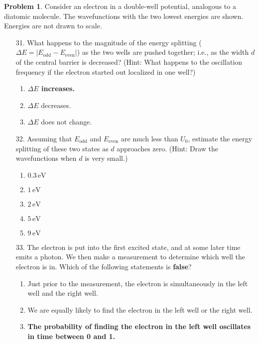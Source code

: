 \documentclass[12pt]{article}
\theoremstyle{definition} %
\newtheorem{problem}{Problem}
\theoremstyle{plain} %
\begin{document}
\begin{problem}
    
Consider an electron in a double-well potential, analogous to a diatomic molecule. The wavefunctions with the two lowest energies are shown. Energies are not drawn to scale.

\begin{enumerate}
    \item[31.] What happens to the magnitude of the energy splitting (\(\Delta E = |E_{\text{odd}} - E_{\text{even}}|\)) as the two wells are pushed together; i.e., as the width \(d\) of the central barrier is decreased? (Hint: What happens to the oscillation frequency if the electron started out localized in one well?)
    \begin{enumerate}
        \item \textbf{\(\Delta E\) increases.}
        \item \(\Delta E\) decreases.
        \item \(\Delta E\) does not change.
    \end{enumerate}

    \item[32.] Assuming that \(E_{\text{odd}}\) and \(E_{\text{even}}\) are much less than \(U_0\), estimate the energy splitting of these two states as \(d\) approaches zero. (Hint: Draw the wavefunctions when \(d\) is very small.)
    \begin{enumerate}
        \item \textbf{\(0.3 \, \text{eV}\)}
        \item \(1 \, \text{eV}\)
        \item \(2 \, \text{eV}\)
        \item \(5 \, \text{eV}\)
        \item \(9 \, \text{eV}\)
    \end{enumerate}

    \item[33.] The electron is put into the first excited state, and at some later time emits a photon. We then make a measurement to determine which well the electron is in. Which of the following statements is \textbf{false}?
    \begin{enumerate}
        \item Just prior to the measurement, the electron is simultaneously in the left well and the right well.
        \item We are equally likely to find the electron in the left well or the right well.
        \item \textbf{The probability of finding the electron in the left well oscillates in time between 0 and 1.}
    \end{enumerate}
\end{enumerate}


\end{problem}
\end{document}
